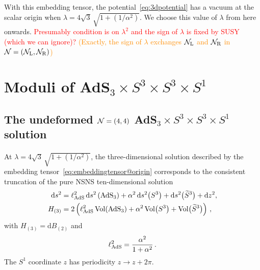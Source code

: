 \documentclass[a4paper, 11pt]{article}
\numberwithin{equation}{section}
\newcommand{\ts}[1]{\widetilde{#1}}
\newcommand{\SL}[1]{\mathrm{SL}( #1 )}
\newcommand{\En}[1]{E_{#1(#1)}}
\newcommand{\+}{\oplus}
\renewcommand{\d}{\ensuremath{\mathrm{d}}\xspace}
\newcommand{\EM}[1]{\textcolor{red}{#1}}
\newcommand{\CE}[1]{\textcolor{darkorange}{#1}}
\begin{document}
With this embedding tensor, the potential~\eqref{eq:3dpotential} has a vacuum at the scalar origin when $\lambda=4\sqrt{3}\,\sqrt{1+(1/\alpha^{2})}$. We choose this value of $\lambda$ from here onwards. \EM{Presumably condition is on $\lambda^2$ and the sign of $\lambda$ is fixed by SUSY (which we can ignore)?} \CE{(Exactly, the sign of $\lambda$ exchanges ${\cal N}_{\rm L}$ and ${\cal N}_{\rm R}$ in ${\cal N}=({\cal N}_{\rm L},{\cal N}_{\rm R})$)}




\section{Moduli of \texorpdfstring{AdS$_3 \times S^3 \times S^3 \times S^1$}{AdS3xS3xS3xS1}} \label{s:Moduli}

\subsection{The undeformed ${\cal N}=(4,4)$ AdS$_3 \times S^3 \times S^3 \times S^1$ solution}
\paragraph{} At $\lambda=4\sqrt{3}\,\sqrt{1+(1/\alpha^{2})}$, the three-dimensional solution described by the embedding tensor~\eqref{eq:embeddingtensor@origin} corresponds to the consistent truncation of the pure NSNS ten-dimensional solution~\cite{deBoer:1999gea}
\begin{equation} \label{eq:AdS3}
	\begin{split}
		\d s^{2} &= \ell_{\rm AdS}^{2}\,\d s^{2}\left({\rm AdS}_{3}\right) + \alpha^{2}\,\d s^{2}\big(S^{3}\big)+\d s^{2}\big(\ts{S}^{3}\big)+\d z^{2},\\
		H_{(3)} &= 2\left(\ell_{\rm AdS}^{2}\,{\rm Vol}({\rm AdS_{3}})+\alpha^{2}\,{\rm Vol}\big(S^{3}\big)+{\rm Vol}\big(\ts{S}^{3}\big)\right)\,,
	\end{split}
\end{equation}
with $H_{(3)} = \d B_{(2)}$ and
\begin{equation}
	\ell_{\rm AdS}^{2} = \frac{\alpha^{2}}{1+\alpha^{2}}\,.
\end{equation}
The $S^{1}$ coordinate $z$ has periodicity $z\rightarrow z+2\pi$.
\end{document}
